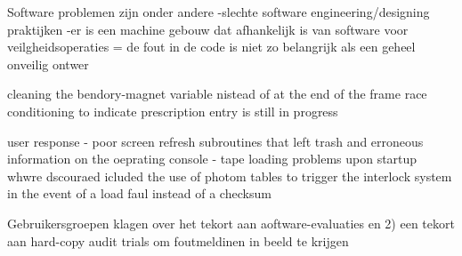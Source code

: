 Software problemen zijn onder andere
-slechte software engineering/designing praktijken
-er is een machine gebouw dat afhankelijk is van software voor veilgheidsoperaties
= de fout in de code is niet zo belangrijk als een geheel onveilig ontwer

cleaning the  bendory-magnet variable nistead of at the end of the frame
race conditioning to indicate prescription entry is still in progress


user response
- poor screen refresh subroutines that left trash and erroneous information on the oeprating console
- tape loading problems upon startup whwre dscouraed icluded the use of photom tables to trigger the interlock system in the event of a  load faul instead of a checksum

Gebruikersgroepen klagen over het tekort aan aoftware-evaluaties en 2) een tekort aan hard-copy audit trials om foutmeldinen in beeld te krijgen


